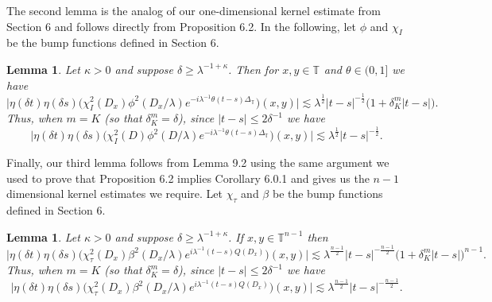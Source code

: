 \documentclass[11pt]{amsart}
\numberwithin{equation}{section}
\newcommand{\la}{\lambda}
\newcommand{\T}[1][]{\mathbb{T}^#1}
\newcommand{\laplac}[1]{\Delta_{#1}}
\newcommand{\dK}[1]{\delta_{K}^{#1}}
\newtheorem{lemma}[theorem]{Lemma}
\begin{document}
The second lemma is the analog of our one-dimensional kernel estimate from Section 6 and  follows directly from Proposition 6.2. In the following, let $\phi$ and $\chi_{I}$ be the bump functions defined in Section 6.
\begin{lemma}
    Let $\kappa > 0$ and suppose $\delta \geq \la^{-1 + \kappa}$. Then for $x,y \in \T{}$ and $\theta \in (0,1]$ we have
\begin{equation} 
     \big|\eta(\delta t)\eta(\delta s)\big( \chi_{I}^{2}(D_x)\phi^2(D_x / \la)e^{-i\la^{-1}\theta(t-s)\laplac{\T{}}} \big)(x,y)\big| \lesssim \la^{\frac{1}{2}}|t-s|^{-\frac{1}{2}}\big(1 + \dK{m}|t-s|\big).
\end{equation} 
Thus, when $m = K$ (so that $\dK{m} = \delta$), since $|t-s| \leq 2\delta^{-1}$ we have 
\begin{equation}
    \big|\eta(\delta t)\eta(\delta s)\big( \chi_{I}^{2}(D)\phi^2(D / \la)e^{-i\la^{-1}\theta(t-s)\laplac{\T{}}} \big)(x,y) \big| \lesssim \la^{\frac{1}{2}}|t-s|^{-\frac{1}{2}}.
\end{equation}
\end{lemma}
Finally, our third lemma follows from Lemma 9.2 using the same argument we used to prove that Proposition 6.2 implies Corollary 6.0.1 and gives us the $n-1$ dimensional kernel estimates we require. Let $\chi_{\tau}$ and $\beta$ be the bump functions defined in Section 6.
\begin{lemma}
    Let $\kappa > 0$ and suppose $\delta \geq \la^{-1 + \kappa}$. If $x,y \in \T{n-1}$ then
    \begin{equation}
        \big|\eta(\delta t)\eta(\delta s)\big( \chi_{\tau}^{2}(D_x)\beta^2(D_x / \la)e^{i\la^{-1}(t-s)Q(D_x)} \big)(x,y)\big| \lesssim \la^{\frac{n-1}{2}}|t-s|^{-\frac{n-1}{2}}\big(1 + \dK{m}|t-s|\big)^{n-1}.
    \end{equation}
Thus, when $m = K$ (so that $\dK{m} = \delta$), since $|t-s| \leq 2\delta^{-1}$ we have 
\begin{equation}
    \big|\eta(\delta t)\eta(\delta s)\big( \chi_{\tau}^{2}(D_x)\beta^2(D_x / \la)e^{i\la^{-1}(t-s)Q(D_x)} \big)(x,y) \big| \lesssim \la^{\frac{n-1}{2}}|t-s|^{-\frac{n-1}{2}}.
\end{equation}
\end{lemma}
\noindent
\end{document}
